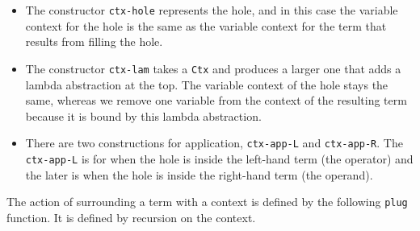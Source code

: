 \begin{itemize}
\item
  The constructor \texttt{ctx-hole} represents the hole, and in this
  case the variable context for the hole is the same as the variable
  context for the term that results from filling the hole.
\item
  The constructor \texttt{ctx-lam} takes a \texttt{Ctx} and produces a
  larger one that adds a lambda abstraction at the top. The variable
  context of the hole stays the same, whereas we remove one variable
  from the context of the resulting term because it is bound by this
  lambda abstraction.
\item
  There are two constructions for application, \texttt{ctx-app-L} and
  \texttt{ctx-app-R}. The \texttt{ctx-app-L} is for when the hole is
  inside the left-hand term (the operator) and the later is when the
  hole is inside the right-hand term (the operand).
\end{itemize}

The action of surrounding a term with a context is defined by the
following \texttt{plug} function. It is defined by recursion on the
context.

